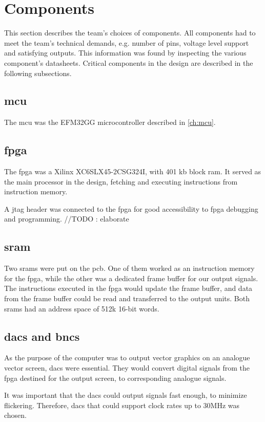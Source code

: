 \section{Components}
This section describes the team's choices of components.
All components had to meet the team's technical demands, e.g. number of pins, voltage level support and satisfying outputs.
This information was found by inspecting the various component's datasheets.
Critical components in the design are described in the following subsections.

\subsection{\gls{mcu}}
The \gls{mcu} was the EFM32GG microcontroller described in \ref{ch:mcu}.

\subsection{\gls{fpga}}
The \gls{fpga} was a Xilinx XC6SLX45-2CSG324I, with 401 kb block \gls{ram}.
It served as the main processor in the design, fetching and executing instructions from instruction memory.

A \gls{jtag} header was connected to the \gls{fpga} for good accessibility to \gls{fpga} debugging and programming.
//TODO : elaborate

\subsection{\gls{sram}}
Two \gls{sram}s were put on the \gls{pcb}. 
One of them worked as an instruction memory for the \gls{fpga}, while the other was a dedicated frame buffer for our output signals. 
The instructions executed in the \gls{fpga} would update the frame buffer, and data from the frame buffer could be read and transferred to the output units. 
Both \gls{sram}s had an address space of 512k 16-bit words.

\subsection{\gls{dac}s and \gls{bnc}s}
As the purpose of the computer was to output vector graphics on an analogue vector screen, \gls{dac}s were essential.
They would convert digital signals from the \gls{fpga} destined for the output screen, to corresponding analogue signals.

It was important that the \gls{dac}s could output signals fast enough, to minimize flickering. 
Therefore, \gls{dac}s that could support clock rates up to 30MHz was chosen.

